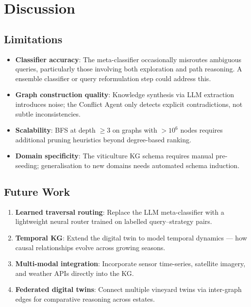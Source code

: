 \documentclass[12pt,a4paper]{article}
\begin{document}
\section{Discussion}

\subsection{Limitations}

\begin{itemize}
  \item \textbf{Classifier accuracy}: The meta-classifier occasionally
    misroutes ambiguous queries, particularly those involving both exploration
    and path reasoning. A ensemble classifier or query reformulation step
    could address this.
  \item \textbf{Graph construction quality}: Knowledge synthesis via LLM
    extraction introduces noise; the Conflict Agent only detects explicit
    contradictions, not subtle inconsistencies.
  \item \textbf{Scalability}: BFS at depth $\geq 3$ on graphs with $>10^6$
    nodes requires additional pruning heuristics beyond degree-based ranking.
  \item \textbf{Domain specificity}: The viticulture KG schema requires
    manual pre-seeding; generalisation to new domains needs automated
    schema induction.
\end{itemize}

\subsection{Future Work}

\begin{enumerate}
  \item \textbf{Learned traversal routing}: Replace the LLM meta-classifier
    with a lightweight neural router trained on labelled query--strategy pairs.
  \item \textbf{Temporal KG}: Extend the digital twin to model temporal dynamics
    — how causal relationships evolve across growing seasons.
  \item \textbf{Multi-modal integration}: Incorporate sensor time-series,
    satellite imagery, and weather APIs directly into the KG.
  \item \textbf{Federated digital twins}: Connect multiple vineyard twins
    via inter-graph edges for comparative reasoning across estates.
\end{enumerate}
\end{document}
